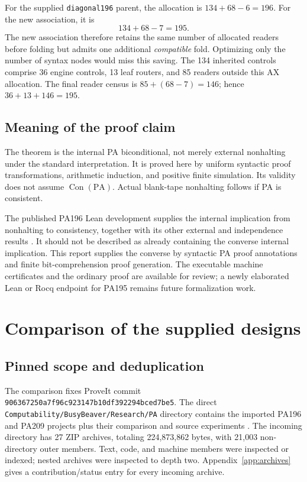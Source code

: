 \documentclass[11pt,letterpaper]{article}
\newcommand{\PA}{\mathrm{PA}}
\newcommand{\Con}{\operatorname{Con}}
\newcommand{\file}[1]{\texttt{\nolinkurl{#1}}}
\begin{document}
For the supplied \file{diagonal196} parent, the allocation is
\(134+68-6=196\).
For the new association, it is
\[
 \boxed{134+68-7=195.}
\]
The new association therefore retains the same number of allocated
readers before folding but admits one additional \emph{compatible}
fold. Optimizing only the number of syntax nodes would miss this saving.
The 134 inherited controls comprise 36 engine controls, 13 leaf routers,
and 85 readers outside this AX allocation. The final reader census is
$85+(68-7)=146$; hence $36+13+146=195$.

\subsection{Meaning of the proof claim}
The theorem is the internal PA biconditional, not merely external
nonhalting under the standard interpretation. It is proved here by
uniform syntactic proof transformations, arithmetic induction, and
positive finite simulation. Its validity does not assume $\Con(\PA)$.
Actual blank-tape nonhalting follows if PA is consistent.

The published PA196 Lean development supplies the internal implication
from nonhalting to consistency, together with its other external and
independence results \cite{chang,bridge}. It should not be described as
already containing the converse internal implication. This report
supplies the converse by syntactic PA proof annotations and finite
bit-comprehension proof generation. The executable machine certificates
and the ordinary proof are available for review; a newly elaborated
Lean or Rocq endpoint for PA195 remains future formalization work.

\section{Comparison of the supplied designs}
\label{sec:comparison}
\subsection{Pinned scope and deduplication}
The comparison fixes ProveIt commit
\file{906367250a7f96c923147b10df392294bced7be5}.
The direct \file{Computability/BusyBeaver/Research/PA} directory contains
the imported PA196 and PA209 projects plus their comparison and source
experiments \cite{comparison}. The incoming directory has 27 ZIP
archives, totaling 224,873,862 bytes, with 21,003 non-directory outer
members. Text, code, and machine members were inspected or indexed;
nested archives were inspected to depth two. Appendix~\ref{app:archives}
gives a contribution/status entry for every incoming archive.
\end{document}
